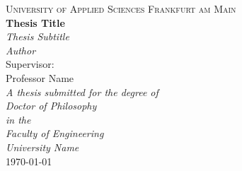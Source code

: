 \begin{titlepage}
    \centering
    \vspace*{1cm}
    {\scshape\Large University of Applied Sciences Frankfurt am Main}\\[1.5cm]
    \vspace*{1.5cm}
    {\huge\bfseries Thesis Title}\\[0.5cm]
    \vspace*{1.5cm}
    {\Large\itshape Thesis Subtitle}\\[3cm]
    \vspace*{2cm}
    {\Large\itshape Author}\\[4cm]
    Supervisor:\\
    Professor Name\\[3cm]
    \vfill
    \textit{A thesis submitted for the degree of}\\[0.5cm]
    \textit{Doctor of Philosophy}\\[4cm]
    \textit{in the}\\[0.5cm]
    \textit{Faculty of Engineering}\\[4cm]
    \textit{University Name}\\[2cm]
    {\large \today}
\end{titlepage}
\tableofcontents
